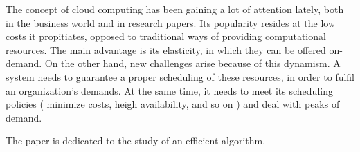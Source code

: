 The concept of cloud computing has been gaining a lot of attention lately, both in the business world and in research papers. Its popularity resides at the low costs it propitiates, opposed to  traditional ways of providing computational resources. The main advantage is its elasticity, in which they can be offered on-demand. On the other hand, new challenges arise because of this dynamism. A system needs to guarantee a proper scheduling of these resources, in order to fulfil an organization's demands. At the same time, it needs to meet its scheduling policies ( minimize costs, heigh availability, and so on )  and deal with peaks of demand.

The paper is dedicated to the study of an efficient algorithm.